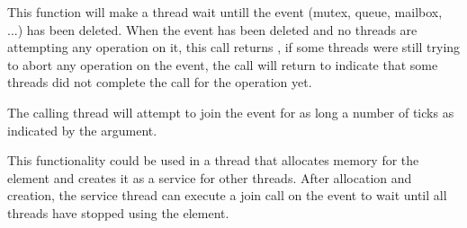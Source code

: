 This function will make a thread wait untill the event (mutex, queue,
mailbox, ...) has been deleted. When the event has been deleted and no
threads are attempting any operation on it, this call returns
, if some threads were still trying to abort any
operation on the event, the call will return  to
indicate that some threads did not complete the call for the operation yet.

The calling thread will attempt to join the event for as long a number of
ticks as indicated by the  argument.

This functionality could be used in a thread that allocates memory for the
element and creates it as a service for other threads. After allocation and
creation, the service thread can execute a join call on the event to wait until
all threads have stopped using the element.
